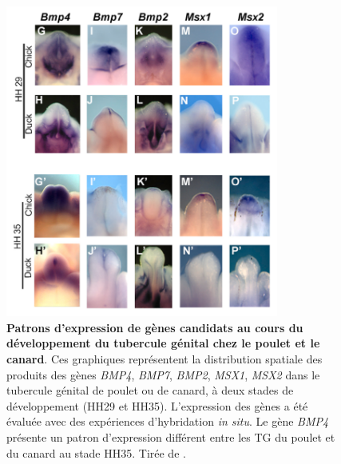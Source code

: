 \begin{figure}[hbt!]
 \centering
 \includegraphics[width=0.8\textwidth, page=1]{figures/IPLOSS/Herrera2013_fig3.png}
 \caption[Patrons d'expression de gènes candidats au cours du développement du tubercule génital chez le poulet et le canard]{
 \textbf{Patrons d'expression de gènes candidats au cours du développement du tubercule génital chez le poulet et le canard}. 
 Ces graphiques représentent la distribution spatiale des produits des gènes \textit{BMP4}, \textit{BMP7}, \textit{BMP2}, \textit{MSX1}, \textit{MSX2} dans le tubercule génital de poulet ou de canard, à deux stades de développement (HH29 et HH35). L'expression des gènes a été évaluée avec des expériences d'hybridation \textit{in situ}. Le gène \textit{BMP4} présente un patron d'expression différent entre les TG du poulet et du canard au stade HH35.
 Tirée de \citet{herrera_developmental_2013}.
 \\
 }
 \label{fig:chap4-fig-herrera-insitu-bmp}
\end{figure} 

